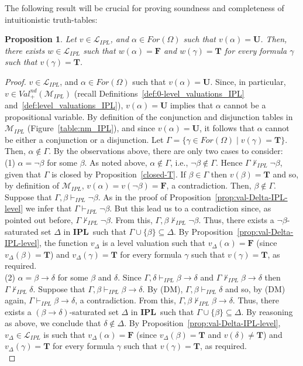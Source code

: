 \documentclass[12pt]{article}
\newtheorem{proposition}[theorem]{Proposition}
\newcommand{\bT}{\mathbf{T}}
\newcommand{\bU}{\mathbf{U}}
\newcommand{\bF}{\mathbf{F}}
\newcommand{\ipl}{\ensuremath{\mathbf{IPL}}}
\begin{document}
The following result will be crucial for proving soundness and completeness of intuitionistic truth-tables:

\begin{proposition} \label{prop-level-val}
 Let $v \in \mathcal{L}_{IPL}$, and $\alpha \in For(\Omega)$ such that $v(\alpha)=\bU$. Then, there exists $w \in  \mathcal{L}_{IPL}$ such that $w(\alpha)=\bF$ and $w(\gamma)=\bT$ for every formula $\gamma$ such that $v(\gamma)=\bT$.
\end{proposition}
\begin{proof}
$v \in \mathcal{L}_{IPL}$, and $\alpha \in For(\Omega)$ such that $v(\alpha)=\bU$. Since, in particular, $v \in Val^{nd}_+(\mathcal{M}_{IPL})$ (recall Definitions~\ref{def:0-level_valuations_IPL} and~\ref{def:level_valuations_IPL}), $v(\alpha)=\bU$ implies that $\alpha$ cannot be a propositional variable.
By definition of the conjunction and disjunction tables in $\mathcal{M}_{IPL}$ (Figure~\ref{table:nm_IPL}), and since $v(\alpha)=\bU$, it follows that $\alpha$ cannot be either a conjunction or a disjunction.
Let $\Gamma=\{\gamma \in For(\Omega)  \mid v(\gamma)=\bT\}$. Then, $\alpha \not\in \Gamma$.  By the observations above, there are only two cases to consider:\\[1mm]
(1) $\alpha=\neg\beta$ for some $\beta$. As noted above, $\alpha \not\in\Gamma$, i.e.,  $\neg\beta \not\in \Gamma$. Hence $\Gamma \nvdash_{IPL}\neg\beta$, given that $\Gamma$ is closed by Proposition~\ref{closed-T}. If $\beta \in \Gamma$ then $v(\beta)=\bT$ and so, by definition of $\mathcal{M}_{IPL}$, $v(\alpha)=v(\neg\beta)=\bF$, a contradiction. Then, $\beta \not\in \Gamma$. Suppose that $\Gamma,\beta \vdash_{IPL}\neg\beta$. As in the proof of Proposition~\ref{prop:val-Delta-IPL-level} we infer that  $\Gamma \vdash_{IPL}\neg\beta$. But this lead us to a contradiction since, as pointed out before,  $\Gamma \nvdash_{IPL}\neg\beta$. From this, $\Gamma,\beta \nvdash_{IPL}\neg\beta$. Thus, there exists a $\neg\beta$-saturated set $\Delta$ in \ipl\ such that $\Gamma \cup\{\beta\} \subseteq \Delta$. By  Proposition~\ref{prop:val-Delta-IPL-level}, the function $v_\Delta$ is a level valuation such that $v_\Delta(\alpha)=\bF$ (since $v_\Delta(\beta)=\bT$) and $v_\Delta(\gamma)=\bT$ for every formula $\gamma$ such that $v(\gamma)=\bT$, as required.\\[1mm]
(2) $\alpha=\beta \to \delta$ for some $\beta$ and $\delta$. Since $\Gamma,\delta \vdash_{IPL} \beta \to \delta$ and  $\Gamma \nvdash_{IPL} \beta \to \delta$ then $\Gamma \nvdash_{IPL} \delta$.  Suppose that $\Gamma,\beta \vdash_{IPL}\beta \to \delta$. By (DM), $\Gamma,\beta \vdash_{IPL} \delta$ and so, by (DM) again, $\Gamma \vdash_{IPL}\beta \to \delta$, a contradiction. From this, $\Gamma,\beta \nvdash_{IPL}\beta \to \delta$. Thus, there exists a $(\beta\to\delta)$-saturated set $\Delta$ in \ipl\ such that $\Gamma \cup\{\beta\} \subseteq \Delta$.  By reasoning as above, we conclude that $\delta \not\in \Delta$.  By  Proposition~\ref{prop:val-Delta-IPL-level}, $v_\Delta\in  \mathcal{L}_{IPL}$ is such that $v_\Delta(\alpha)=\bF$ (since $v_\Delta(\beta)=\bT$ and $v(\delta)\neq \bT$) and $v_\Delta(\gamma)=\bT$ for every formula $\gamma$ such that $v(\gamma)=\bT$, as required.\\[1mm]

\end{proof}
\end{document}
